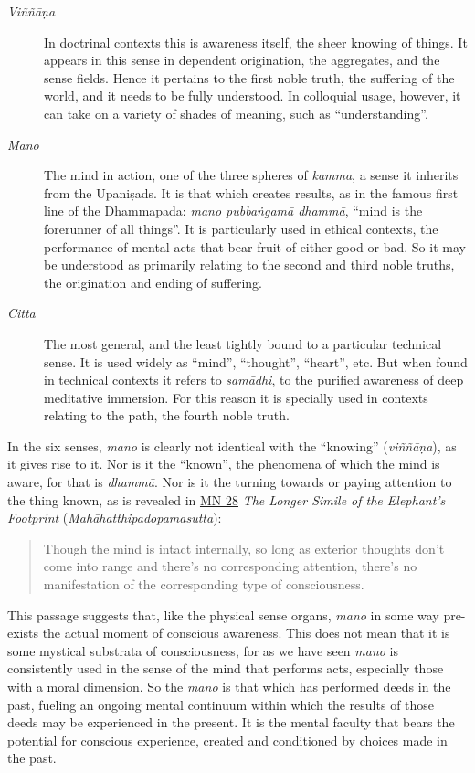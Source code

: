 \documentclass[12pt,openany]{book}%
\begin{document}
\begin{description}%
\item[\textit{\textsanskrit{Viññāṇa}}] In doctrinal contexts this is awareness itself, the sheer knowing of things. It appears in this sense in dependent origination, the aggregates, and the sense fields. Hence it pertains to the first noble truth, the suffering of the world, and it needs to be fully understood. In colloquial usage, however, it can take on a variety of shades of meaning, such as “understanding”.%
\item[\textit{Mano}] The mind in action, one of the three spheres of \textit{kamma}, a sense it inherits from the \textsanskrit{Upaniṣads}. It is that which creates results, as in the famous first line of the Dhammapada: \textit{mano \textsanskrit{pubbaṅgamā} \textsanskrit{dhammā}}, “mind is the forerunner of all things”. It is particularly used in ethical contexts, the performance of mental acts that bear fruit of either good or bad. So it may be understood as primarily relating to the second and third noble truths, the origination and ending of suffering.%
\item[\textit{Citta}] The most general, and the least tightly bound to a particular technical sense. It is used widely as “mind”, “thought”, “heart”, etc. But when found in technical contexts it refers to \textit{\textsanskrit{samādhi}}, to the purified awareness of deep meditative immersion. For this reason it is specially used in contexts relating to the path, the fourth noble truth.%
\end{description}

In the six senses, \textit{mano} is clearly not identical with the “knowing” (\textit{\textsanskrit{viññāṇa}}), as it gives rise to it. Nor is it the “known”, the phenomena of which the mind is aware, for that is \textit{\textsanskrit{dhammā}}. Nor is it the turning towards or paying attention to the thing known, as is revealed in \href{https://suttacentral.net/mn28}{MN 28} \textit{The Longer Simile of the Elephant’s Footprint} (\textit{\textsanskrit{Mahāhatthipadopamasutta}}):

\begin{quotation}%
Though the mind is intact internally, so long as exterior thoughts don’t come into range and there’s no corresponding attention, there’s no manifestation of the corresponding type of consciousness.

%
\end{quotation}

This passage suggests that, like the physical sense organs, \textit{mano} in some way pre-exists the actual moment of conscious awareness. This does not mean that it is some mystical substrata of consciousness, for as we have seen \textit{mano} is consistently used in the sense of the mind that performs acts, especially those with a moral dimension. So the \textit{mano} is that which has performed deeds in the past, fueling an ongoing mental continuum within which the results of those deeds may be experienced in the present. It is the mental faculty that bears the potential for conscious experience, created and conditioned by choices made in the past.
\end{document}
